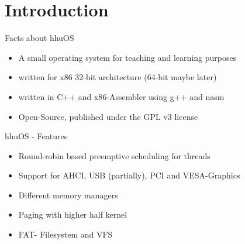 \section{Introduction}
	
	\begin{frame}{Facts about hhuOS}
		\begin{itemize}
			\item A small operating system for teaching and learning purposes
			\item written for x86 32-bit architecture (64-bit maybe later)
			\item written in C++ and x86-Assembler using g++ and nasm
			\item Open-Source, published under the GPL v3 license
		\end{itemize}
	\end{frame}
	
	\begin{frame}{hhuOS - Features}
		\begin{itemize}
			\item Round-robin based preemptive scheduling for threads
			\item Support for AHCI, USB (partially), PCI and VESA-Graphics
			\item Different memory managers
			\item Paging with higher half kernel
			\item FAT- Filesystem and VFS
		\end{itemize}
	\end{frame}